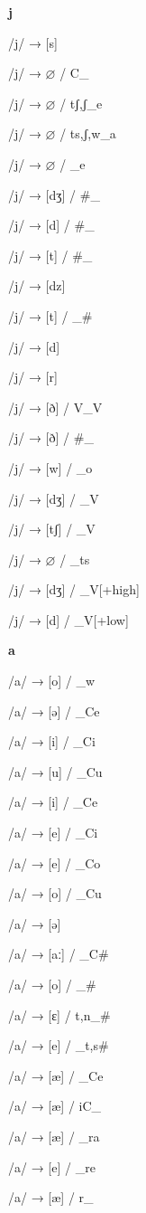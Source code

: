 \begin{center}\textbf{j}\end{center}
\begin{multicols}{4}
\noindent /j/ → [s]

\noindent /j/ → $\varnothing$ / C\_

\noindent /j/ → $\varnothing$ / {tʃ,ʃ}\_e

\noindent /j/ → $\varnothing$ / {ts,ʃ,w}\_a

\noindent /j/ → $\varnothing$ / \_e

\noindent /j/ → [dʒ] / \#\_

\noindent /j/ → [d] / \#\_

\noindent /j/ → [t] / \#\_

\noindent /j/ → [dz]

\noindent /j/ → [t] / \_\#

\noindent /j/ → [d]

\noindent /j/ → [r]

\noindent /j/ → [ð] / V\_V

\noindent /j/ → [ð] / \#\_

\noindent /j/ → [w] / \_o

\noindent /j/ → [dʒ] / \_V

\noindent /j/ → [tʃ] / \_V

\noindent /j/ → $\varnothing$ / \_ts

\noindent /j/ → [dʒ] / \_V[+high]

\noindent /j/ → [d] / \_V[+low]

\end{multicols}

\begin{center}\textbf{a}\end{center}
\begin{multicols}{4}
\noindent /a/ → [o] / \_w

\noindent /a/ → [ə] / \_Ce

\noindent /a/ → [i] / \_Ci

\noindent /a/ → [u] / \_Cu

\noindent /a/ → [i] / \_Ce

\noindent /a/ → [e] / \_Ci

\noindent /a/ → [e] / \_Co

\noindent /a/ → [o] / \_Cu

\noindent /a/ → [ə]

\noindent /a/ → [aː] / \_C\#

\noindent /a/ → [o] / \_\#

\noindent /a/ → [ɛ] / {t,n}\_\#

\noindent /a/ → [e] / \_{t,s}\#

\noindent /a/ → [æ] / \_Ce

\noindent /a/ → [æ] / iC\_

\noindent /a/ → [æ] / \_ra

\noindent /a/ → [e] / \_re

\noindent /a/ → [æ] / r\_

\end{multicols}

